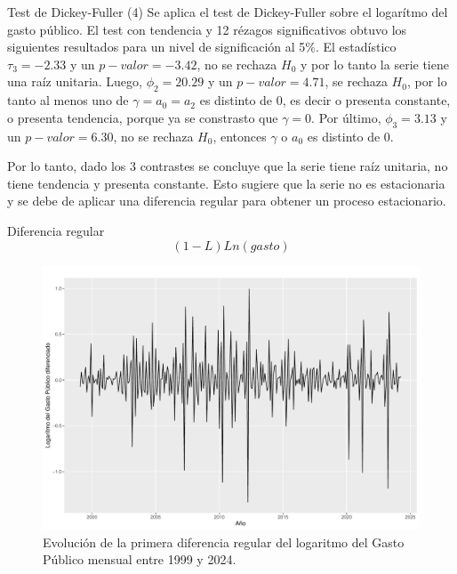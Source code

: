 \documentclass[
  ignorenonframetext,
]{beamer}
\begin{document}
\begin{frame}{Test de Dickey-Fuller (4)}
\protect\hypertarget{test-de-dickey-fuller-4}{}
Se aplica el test de Dickey-Fuller sobre el logarítmo del gasto público.
El test con tendencia y 12 rézagos significativos obtuvo los siguientes
resultados para un nivel de significación al 5\%. El estadístico
\(\tau_3 = -2.33\) y un \(p-valor=-3.42\), no se rechaza \(H_0\) y por
lo tanto la serie tiene una raíz unitaria. Luego, \(\phi_2 = 20.29\) y
un \(p-valor=4.71\), se rechaza \(H_0\), por lo tanto al menos uno de
\(\gamma = a_0 = a_2\) es distinto de 0, es decir o presenta constante,
o presenta tendencia, porque ya se constrasto que \(\gamma = 0\). Por
último, \(\phi_3 = 3.13\) y un \(p-valor=6.30\), no se rechaza \(H_0\),
entonces \(\gamma\) o \(a_0\) es distinto de 0.

Por lo tanto, dado los 3 contrastes se concluye que la serie tiene raíz
unitaria, no tiene tendencia y presenta constante. Esto sugiere que la
serie no es estacionaria y se debe de aplicar una diferencia regular
para obtener un proceso estacionario.
\end{frame}

\begin{frame}{Diferencia regular}
\protect\hypertarget{diferencia-regular}{}
\[(1-L)Ln(gasto)\]

\begin{figure}[H]

{\centering \includegraphics[width=0.75\linewidth]{presentacion_files/figure-beamer/unnamed-chunk-2-1} 

}

\caption{\label{diff_plot} Evolución de la primera diferencia regular del logaritmo del Gasto Público mensual entre 1999 y 2024.}\label{fig:unnamed-chunk-2}
\end{figure}
\end{frame}
\end{document}
